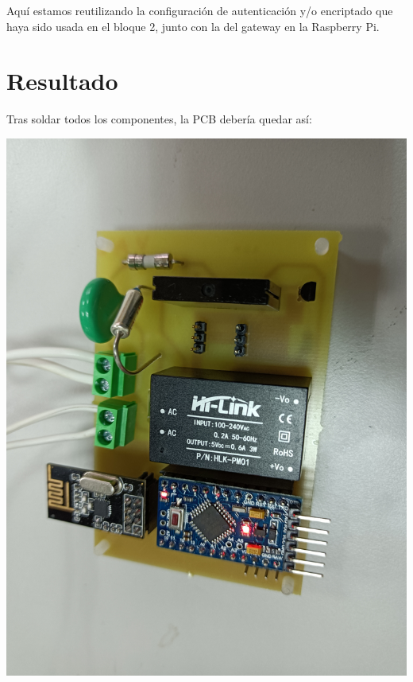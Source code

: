 Aquí estamos reutilizando la configuración de autenticación y/o encriptado que
haya sido usada en el bloque 2, junto con la del gateway en la Raspberry Pi.

\section{Resultado}

Tras soldar todos los componentes, la PCB debería quedar así:

\includegraphics[width=\linewidth]{pcb-front.jpg}

